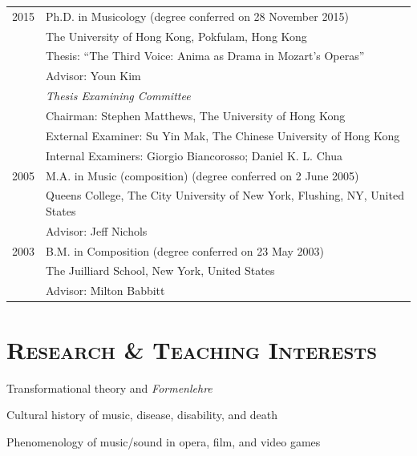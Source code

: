 \documentclass[a4paper,11pt,draft]{article}
\begin{document}
  \hspace*{-0.25cm}
  \begin{tabular}{p{2.5cm} l}
    2015 & Ph.D. in Musicology (degree conferred on 28 November 2015)\\
    & The University of Hong Kong, Pokfulam, Hong Kong\\
    & Thesis: ``The Third Voice: Anima as Drama in Mozart's Operas''\\
    & Advisor: Youn Kim\\[2mm]
    & \textit{Thesis Examining Committee}\\
    & Chairman: Stephen Matthews, The University of Hong Kong\\
    & External Examiner: Su Yin Mak, The Chinese University of Hong Kong\\
    & Internal Examiners: Giorgio Biancorosso; Daniel K. L. Chua\\[2mm]
    
	2005 & M.A. in Music (composition) (degree conferred on 2 June 2005)\\
    & Queens College, The City University of New York, Flushing, NY, United
    States\\
	& Advisor: Jeff Nichols\\[2mm]

    2003 & B.M. in Composition (degree conferred on 23 May 2003)\\
    & The Juilliard School, New York, United States\\
    & Advisor: Milton Babbitt
  \end{tabular}
  
  \vspace{3mm}
  
  \section*{\textsc{Research \& Teaching Interests}}
  
  \noindent \hspace{2mm} \textbullet \hspace{2mm} Transformational theory and \textit{Formenlehre}
  
  \noindent \hspace{2mm} \textbullet \hspace{2mm} Cultural history of music, disease, disability, and death
  
  \noindent \hspace{2mm} \textbullet \hspace{2mm} Phenomenology of music/sound in opera, film, and video games
  
\end{document}
